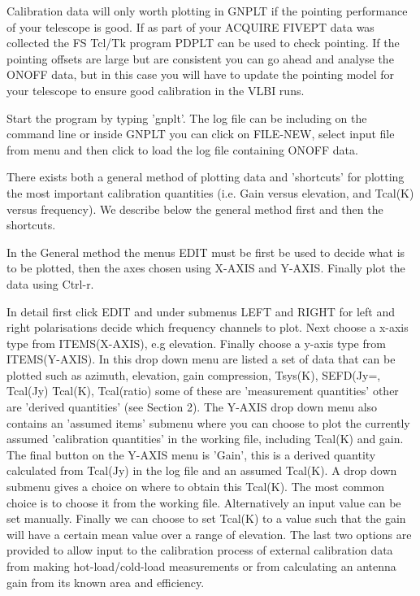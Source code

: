   Calibration data will only worth plotting in GNPLT if the pointing 
  performance of your telescope is good. If as part of your ACQUIRE  
  FIVEPT data was collected the FS Tcl/Tk program 
  PDPLT can be used to check pointing. If the pointing offsets
  are large but are consistent you can go ahead and analyse the ONOFF
  data, but in this case you will have to update the pointing model for
  your telescope to ensure good calibration in the VLBI runs.

\vskip 0.5cm

\vskip 0.5cm

   Start the program by typing 'gnplt'. The log file can be 
   including on the command line or inside GNPLT you can 
   click on FILE-NEW, select input file from menu and then click
   to load the log file containing ONOFF data.

\vskip 0.5cm


\vskip 0.5cm

   There exists both a general method of plotting data and 
'shortcuts' for plotting the most important calibration quantities
(i.e. Gain versus elevation, and Tcal(K) versus frequency). We describe 
below the general method first and then the shortcuts.

\vskip 0.3cm
 In the General method the menus EDIT must be 
first be used to decide what is  to be plotted, then the axes chosen using 
X-AXIS and Y-AXIS. Finally plot the data using Ctrl-r.

In detail first click EDIT and under submenus LEFT and RIGHT for 
left and right polarisations decide which 
 frequency channels to plot. Next choose a x-axis type from ITEMS(X-AXIS), 
e.g elevation. Finally  choose a y-axis type from ITEMS(Y-AXIS). 
In this drop down menu are listed a set of  data that can be plotted such as  
azimuth, elevation, gain compression, Tsys(K), SEFD(Jy=, Tcal(Jy) Tcal(K),
Tcal(ratio) some of these  are 'measurement quantities' other are 'derived 
quantities' (see Section 2). The Y-AXIS drop down menu  also contains an  
'assumed items'  submenu where you can choose to plot the currently assumed 
'calibration quantities' in the working file, including Tcal(K) and gain. 
The final
button  on the Y-AXIS menu is 'Gain', this is a derived quantity  calculated
from Tcal(Jy) in the log file and an assumed Tcal(K). A drop down submenu
gives a choice on where to obtain this Tcal(K). The most common choice is to 
choose it from the working file. Alternatively an input value can be set
manually. Finally we can choose to set Tcal(K) to a value such that the 
gain will have a certain mean value over a range of elevation. The last two 
options are provided to allow input to the calibration process of external
calibration data from making hot-load/cold-load measurements or from
calculating an antenna gain from its known area and efficiency.

